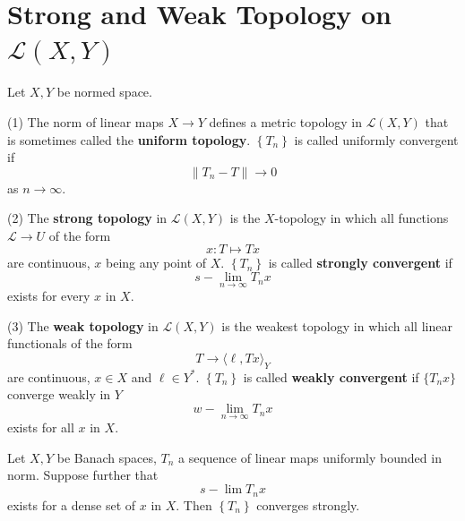 \documentclass[12pt, oneside]{book}
\begin{document}
\section{Strong and Weak Topology on \texorpdfstring{$\mathcal{L}(X,Y)$}{}}

\begin{definition}
    Let $X,Y$ be normed space.

    (1) The norm of linear maps $X \rightarrow Y$ defines a metric topology in $\mathcal{L}(X, Y)$ that is sometimes called the \textbf{uniform topology}. $\left\{T_n\right\}$ is called uniformly convergent if
    \begin{equation*}
        \|T_n-T\|
        \to
        0
    \end{equation*}
    as $n\to \infty$.

    (2) The \textbf{strong topology} in $\mathcal{L}(X, Y)$ is the $X$-topology in which all functions
    $\mathcal{L} \rightarrow U$ of the form
    \begin{equation*}
        x : T \mapsto T x
    \end{equation*}
    are continuous, $x$ being any point of $X$. $\left\{T_n\right\}$ is called \textbf{strongly convergent} if
    \begin{equation*}
        s-\lim _{n \rightarrow \infty} T_n x
    \end{equation*}
    exists for every $x$ in $X$.

    (3) The \textbf{weak topology} in $\mathcal{L}(X, Y)$ is the weakest topology in which all linear functionals of the form
    \begin{equation*}
        T \longrightarrow
        \langle  \ell,T x \rangle_Y
    \end{equation*}
    are continuous, $x\in X$ and $\ell\in Y^*$. $\left\{T_n\right\}$ is called \textbf{weakly convergent }if $\{T_n x\}$ converge weakly in $Y$
    \begin{equation*}
        w-\lim _{n \rightarrow \infty} T_n x
    \end{equation*}
    exists for all $x$ in $X$.
\end{definition}


\begin{theorem}
    Let $X, Y$ be Banach spaces, $T_n$ a sequence of linear maps uniformly bounded in norm.
    Suppose further that
    \begin{equation*}
        s-\lim T_n x
    \end{equation*}
    exists for a dense set of $x$ in $X$. Then $\left\{T_n\right\}$ converges strongly.
\end{theorem}
\end{document}

